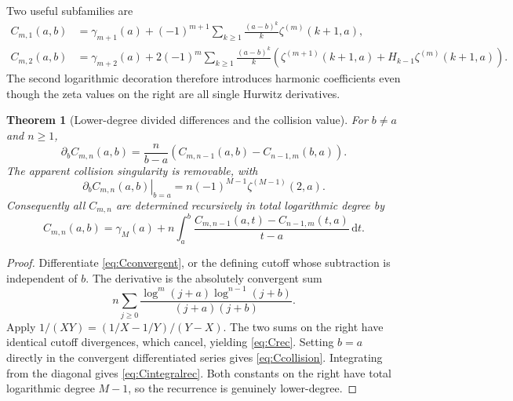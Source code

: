 \documentclass[11pt,a4paper]{article}
\numberwithin{equation}{section}
\newtheorem{theorem}{Theorem}[section]
\theoremstyle{definition}\newtheorem{definition}[theorem]{Definition}
\theoremstyle{remark}\newtheorem{remark}[theorem]{Remark}
\newcommand{\dd}{\,\mathrm d}
\begin{document}
Two useful subfamilies are
\begin{align}
 C_{m,1}(a,b)
 &=\gamma_{m+1}(a)+(-1)^{m+1}
       \sum_{k\ge1}\frac{(a-b)^k}{k}\zeta^{(m)}(k+1,a),
 \label{eq:Cm1}\\
 C_{m,2}(a,b)
 &=\gamma_{m+2}(a)+2(-1)^m\sum_{k\ge1}\frac{(a-b)^k}{k}
       \left(\zeta^{(m+1)}(k+1,a)
                        +H_{k-1}\zeta^{(m)}(k+1,a)\right).
 \label{eq:Cm2}
\end{align}
The second logarithmic decoration therefore introduces harmonic
coefficients even though the zeta values on the right are all single
Hurwitz derivatives.

\begin{theorem}[Lower-degree divided differences and the collision value]
\label{thm:Crec}
For $b\ne a$ and $n\ge1$,
\begin{equation}
 \partial_b C_{m,n}(a,b)
 =\frac{n}{b-a}
        \left(C_{m,n-1}(a,b)-C_{n-1,m}(b,a)\right).
 \label{eq:Crec}
\end{equation}
The apparent collision singularity is removable, with
\begin{equation}
 \left.\partial_b C_{m,n}(a,b)\right|_{b=a}
       =n(-1)^{M-1}\zeta^{(M-1)}(2,a).
 \label{eq:Ccollision}
\end{equation}
Consequently all $C_{m,n}$ are determined recursively in total
logarithmic degree by
\begin{equation}
 C_{m,n}(a,b)=\gamma_M(a)+n\int_a^b
    \frac{C_{m,n-1}(a,t)-C_{n-1,m}(t,a)}{t-a}\dd t.
 \label{eq:Cintegralrec}
\end{equation}
\end{theorem}
\begin{proof}
Differentiate \eqref{eq:Cconvergent}, or the defining cutoff whose
subtraction is independent of $b$. The derivative is the absolutely
convergent sum
\[
 n\sum_{j\ge0}\frac{\log^m(j+a)\log^{n-1}(j+b)}{(j+a)(j+b)}.
\]
Apply $1/(XY)=(1/X-1/Y)/(Y-X)$. The two sums on the right have
identical cutoff divergences, which cancel, yielding \eqref{eq:Crec}.
Setting $b=a$ directly in the convergent differentiated series gives
\eqref{eq:Ccollision}. Integrating from the diagonal gives
\eqref{eq:Cintegralrec}. Both constants on the right have total
logarithmic degree $M-1$, so the recurrence is genuinely lower-degree.
\end{proof}
\end{document}
